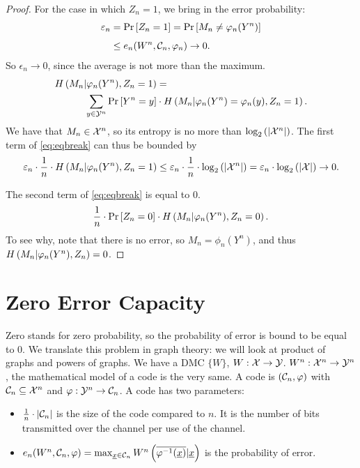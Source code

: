 \begin{proof}
	For the case in which $Z_n = 1$, we bring in the error probability:
	\begin{align*}
	  \varepsilon_n
	  & =
	  \mathop{\mathrm{Pr}}\limits_{} \left[ {Z_n = 1} \right] =
	  \mathop{\mathrm{Pr}}\limits_{} \left[ {M_n \neq \varphi_n(Y^n)} \right]
	  \\
	  & \le
	  e_n(W^n, \mathcal{C}_n, \varphi_n) \to 0.
	\end{align*}
	So $\epsilon_n \to 0$, since the average is not more than the maximum.
	\begin{align*}
		H\left({M_n | \varphi_n(Y^n), Z_n = 1}\right)
		& =
		\\
		\sum_{y \in \mathcal{Y}^n} \mathop{\mathrm{Pr}}\limits_{} \left[ {Y^n = y} \right]
		& \cdot
		H\left({M_n | \varphi_n(Y^n) = \varphi_n(y), Z_n = 1}\right).
	\end{align*}
	We have that $M_n \in \mathcal{X}^n$, so its entropy is no more than $\log_2 \left( {\left|{\mathcal{X}^n}\right|} \right)$.
	The first term of \cref{eq:eqbreak} can thus be bounded by
	\begin{equation*}
		\varepsilon_n \cdot
		\frac{1}{n} \cdot
		H\left({M_n | \varphi_n(Y^n), Z_n = 1}\right)
		\le
		\varepsilon_n \cdot
		\frac{1}{n} \cdot
		\log_2 \left( {\left|{\mathcal{X}^n}\right|} \right)
		=
		\varepsilon_n \cdot
		\log_2 \left( {\left|{\mathcal{X}}\right|} \right)
		\to 0.
	\end{equation*}

	The second term of \cref{eq:eqbreak} is equal to 0.
	\begin{equation*}
		\frac{1}{n} \cdot \mathop{\mathrm{Pr}}\limits_{} \left[ {Z_n = 0} \right] \cdot H\left({M_n | \varphi_n(Y^n), Z_n = 0}\right).
	\end{equation*}
	To see why, note that there is no error, so $M_n = \phi_n(Y^n)$, and thus $H\left({M_n | \varphi_n(Y^n), Z_n}\right) = 0$.
\end{proof}


\section{Zero Error Capacity}

Zero stands for zero probability, so the probability of error is bound to be equal to 0.
We translate this problem in graph theory: we will look
at product of graphs and powers of graphs.
We have a \ac{DMC} $\{W\}$, $W : \mathcal{X} \to \mathcal{Y}$.
$W^n : \mathcal{X}^n \to \mathcal{Y}^n$, the mathematical model of a code is the very same.
A code is $(\mathcal{C}_n, \varphi)$ with $\mathcal{C}_n \subseteq \mathcal{X}^n$ and $\varphi: \mathcal{Y}^n \to \mathcal{C}_n$.
A code has two parameters:
\begin{itemize}
	\item $\frac{1}{n} \cdot \left|{\mathcal{C}_n}\right|$ is the size of the code compared to $n$.
		It is the number of bits transmitted over the channel per use of the channel.
	\item $e_n(W^n, \mathcal{C}_n, \varphi) = \max_{\underline{x} \in \mathcal{C}_n} W^n \left( \overline{\varphi^{-1}(\underline{x})} | \underline{x} \right)$ is the probability of error.
\end{itemize}

